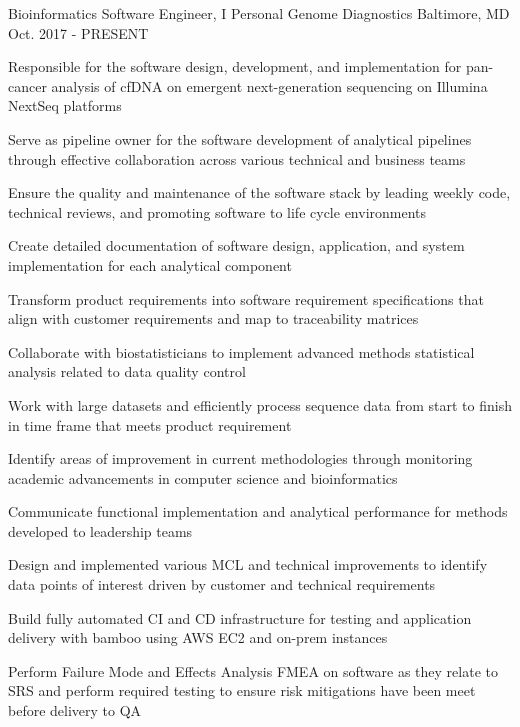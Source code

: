 

\begin{cventries}

  \cventry
    {Bioinformatics Software Engineer, I} %
    {Personal Genome Diagnostics} %
    {Baltimore, MD} %
    {Oct. 2017 - PRESENT} %
    {
      \begin{cvitems} %
        \item{Responsible for the software design, development, and implementation for pan-cancer analysis of cfDNA on emergent next-generation sequencing on Illumina NextSeq platforms}
        \item{Serve as pipeline owner for the software development of analytical pipelines through effective collaboration across various technical and business teams}
        \item{Ensure the quality and maintenance of the software stack by leading weekly code, technical reviews, and promoting software to life cycle environments}
        \item{Create detailed documentation of software design, application, and system implementation for each analytical component}
        \item{Transform product requirements into software requirement specifications that align with customer requirements and map to traceability matrices}
        \item{Collaborate with biostatisticians to implement advanced methods statistical analysis related to data quality control}
        \item{Work with large datasets and efficiently process sequence data from start to finish in time frame that meets product requirement}
        \item{Identify areas of improvement in current methodologies through monitoring academic advancements in computer science and bioinformatics}
        \item{Communicate functional implementation and analytical performance for methods developed to leadership teams}
        \item{Design and implemented various MCL and technical improvements to identify data points of interest driven by customer and technical requirements}
        \item{Build fully automated CI and CD infrastructure for testing and application delivery with bamboo using AWS EC2 and on-prem instances}
        \item{Perform Failure Mode and Effects Analysis FMEA on software as they relate to SRS and perform required testing to ensure risk mitigations have been meet before delivery to QA}
      \end{cvitems}
    }


\end{cventries}
